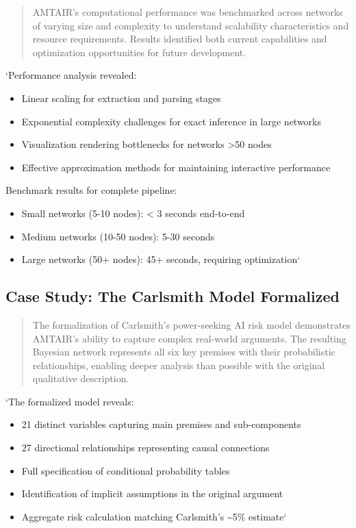 \documentclass[]{book}
\providecommand{\tightlist}{%
  \setlength{\itemsep}{0pt}\setlength{\parskip}{0pt}}
\begin{document}
\begin{quote}
AMTAIR's computational performance was benchmarked across networks of
varying size and complexity to understand scalability characteristics
and resource requirements. Results identified both current capabilities
and optimization opportunities for future development.
\end{quote}

`Performance analysis revealed:

\begin{itemize}
\tightlist
\item
  Linear scaling for extraction and parsing stages
\item
  Exponential complexity challenges for exact inference in large
  networks
\item
  Visualization rendering bottlenecks for networks \textgreater50 nodes
\item
  Effective approximation methods for maintaining interactive
  performance
\end{itemize}

Benchmark results for complete pipeline:

\begin{itemize}
\tightlist
\item
  Small networks (5-10 nodes): \textless{} 3 seconds end-to-end
\item
  Medium networks (10-50 nodes): 5-30 seconds
\item
  Large networks (50+ nodes): 45+ seconds, requiring optimization`
\end{itemize}

\subsection{Case Study: The Carlsmith Model
Formalized}\label{sec-carlsmith-case-study}

\begin{quote}
The formalization of Carlsmith's power-seeking AI risk model
demonstrates AMTAIR's ability to capture complex real-world arguments.
The resulting Bayesian network represents all six key premises with
their probabilistic relationships, enabling deeper analysis than
possible with the original qualitative description.
\end{quote}

`The formalized model reveals:

\begin{itemize}
\tightlist
\item
  21 distinct variables capturing main premises and sub-components
\item
  27 directional relationships representing causal connections
\item
  Full specification of conditional probability tables
\item
  Identification of implicit assumptions in the original argument
\item
  Aggregate risk calculation matching Carlsmith's \textasciitilde5\%
  estimate`
\end{itemize}
\end{document}
